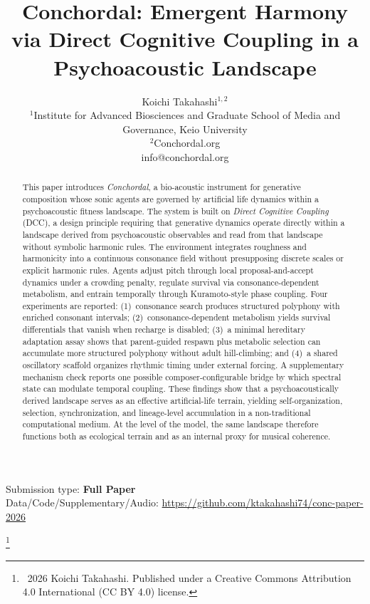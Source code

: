 \documentclass[letterpaper]{article}
\title{Conchordal: Emergent Harmony via Direct Cognitive Coupling in a Psychoacoustic Landscape}
\author{
    Koichi Takahashi$^{1,2}$
    \mbox{}\\
    $^1$Institute for Advanced Biosciences and Graduate School of Media and Governance, Keio University \\
    $^2$Conchordal.org \\
    info@conchordal.org
} %
\newif\ifarxiv
\newcommand\blfootnote[1]{%
  \begingroup
  \renewcommand\thefootnote{}\footnote{#1}%
  \addtocounter{footnote}{-1}%
  \endgroup
}
\begin{document}
\maketitle

\begin{abstract}
This paper introduces \textit{Conchordal}, a bio-acoustic instrument for generative composition whose sonic agents are governed by artificial life dynamics within a psychoacoustic fitness landscape. The system is built on \emph{Direct Cognitive Coupling} (DCC), a design principle requiring that generative dynamics operate directly within a landscape derived from psychoacoustic observables and read from that landscape without symbolic harmonic rules. The environment integrates roughness and harmonicity into a continuous consonance field without presupposing discrete scales or explicit harmonic rules. Agents adjust pitch through local proposal-and-accept dynamics under a crowding penalty, regulate survival via consonance-dependent metabolism, and entrain temporally through Kuramoto-style phase coupling. Four experiments are reported: (1)~consonance search produces structured polyphony with enriched consonant intervals; (2)~consonance-dependent metabolism yields survival differentials that vanish when recharge is disabled; (3)~a minimal hereditary adaptation assay shows that parent-guided respawn plus metabolic selection can accumulate more structured polyphony without adult hill-climbing; and (4)~a shared oscillatory scaffold organizes rhythmic timing under external forcing. A supplementary mechanism check reports one possible composer-configurable bridge by which spectral state can modulate temporal coupling. These findings show that a psychoacoustically derived landscape serves as an effective artificial-life terrain, yielding self-organization, selection, synchronization, and lineage-level accumulation in a non-traditional computational medium. At the level of the model, the same landscape therefore functions both as ecological terrain and as an internal proxy for musical coherence.
\end{abstract}

\ifarxiv\else
Submission type: \textbf{Full Paper}\\
\fi

Data/Code/Supplementary/Audio: \url{https://github.com/ktakahashi74/conc-paper-2026}
\ifarxiv\else
\blfootnote{\textcopyright\ 2026 Koichi Takahashi. Published under a Creative Commons Attribution 4.0 International (CC BY 4.0) license.}
\fi
\end{document}
